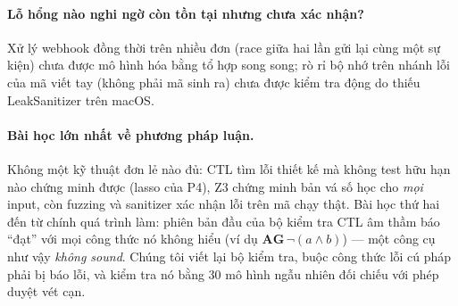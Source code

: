 \paragraph{Lỗ hổng nào nghi ngờ còn tồn tại nhưng chưa xác nhận?}
Xử lý webhook đồng thời trên nhiều đơn (race giữa hai lần gửi lại cùng một sự kiện) chưa được mô
hình hóa bằng tổ hợp song song; rò rỉ bộ nhớ trên nhánh lỗi của mã viết tay (không phải mã sinh ra)
chưa được kiểm tra động do thiếu LeakSanitizer trên macOS.

\paragraph{Bài học lớn nhất về phương pháp luận.}
Không một kỹ thuật đơn lẻ nào đủ: CTL tìm lỗi thiết kế mà không test hữu hạn nào chứng minh được
(lasso của P4), Z3 chứng minh bản vá số học cho \emph{mọi} input, còn fuzzing và sanitizer xác nhận
lỗi trên mã chạy thật. Bài học thứ hai đến từ chính quá trình làm: phiên bản đầu của bộ kiểm tra
CTL âm thầm báo ``đạt'' với mọi công thức nó không hiểu (ví dụ $\mathbf{AG}\,\neg(a \wedge b)$) —
một công cụ như vậy \emph{không sound}. Chúng tôi viết lại bộ kiểm tra, buộc công thức lỗi cú pháp
phải bị báo lỗi, và kiểm tra nó bằng 30 mô hình ngẫu nhiên đối chiếu với phép duyệt vét cạn.
